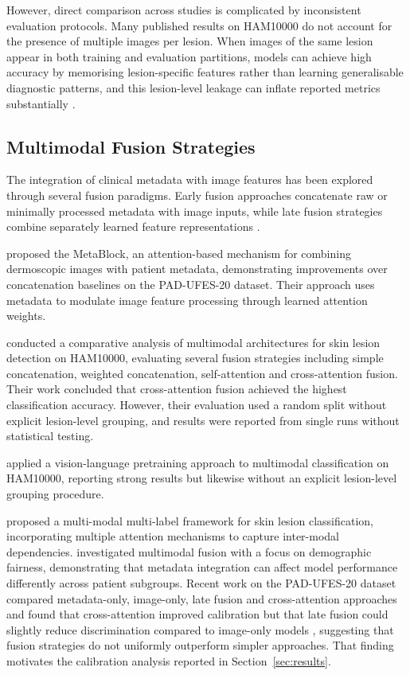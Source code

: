 \documentclass[conference]{IEEEtran}
\begin{document}
However, direct comparison across studies is complicated by inconsistent evaluation protocols. Many published results on HAM10000 do not account for the presence of multiple images per lesion. When images of the same lesion appear in both training and evaluation partitions, models can achieve high accuracy by memorising lesion-specific features rather than learning generalisable diagnostic patterns, and this lesion-level leakage can inflate reported metrics substantially \citep{jamaludin2026quantum}.

\subsection{Multimodal Fusion Strategies}

The integration of clinical metadata with image features has been explored through several fusion paradigms. Early fusion approaches concatenate raw or minimally processed metadata with image inputs, while late fusion strategies combine separately learned feature representations \citep{pacheco2021attention}.

\citet{pacheco2021attention} proposed the MetaBlock, an attention-based mechanism for combining dermoscopic images with patient metadata, demonstrating improvements over concatenation baselines on the PAD-UFES-20 dataset. Their approach uses metadata to modulate image feature processing through learned attention weights.

\citet{das2025comparative} conducted a comparative analysis of multimodal architectures for skin lesion detection on HAM10000, evaluating several fusion strategies including simple concatenation, weighted concatenation, self-attention and cross-attention fusion. Their work concluded that cross-attention fusion achieved the highest classification accuracy. However, their evaluation used a random split without explicit lesion-level grouping, and results were reported from single runs without statistical testing.

\citet{adebiyi2024accurate} applied a vision-language pretraining approach to multimodal classification on HAM10000, reporting strong results but likewise without an explicit lesion-level grouping procedure.

\citet{alfahdawi2025novel} proposed a multi-modal multi-label framework for skin lesion classification, incorporating multiple attention mechanisms to capture inter-modal dependencies. \citet{wang2024skin} investigated multimodal fusion with a focus on demographic fairness, demonstrating that metadata integration can affect model performance differently across patient subgroups. Recent work on the PAD-UFES-20 dataset compared metadata-only, image-only, late fusion and cross-attention approaches and found that cross-attention improved calibration but that late fusion could slightly reduce discrimination compared to image-only models \citep{mridha2026crossattention}, suggesting that fusion strategies do not uniformly outperform simpler approaches. That finding motivates the calibration analysis reported in Section~\ref{sec:results}.
\end{document}
